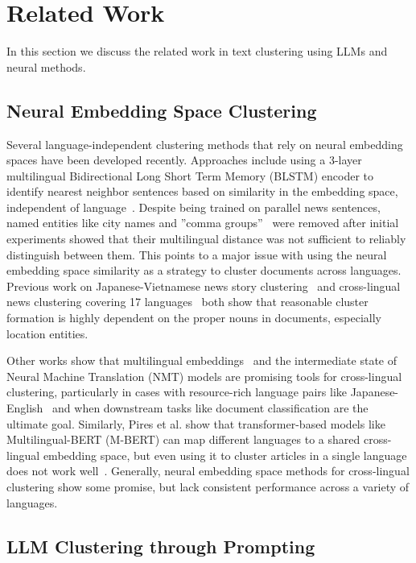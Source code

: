 \section{Related Work}\label{section:related_work}

In this section we discuss the related work in text clustering using LLMs and neural methods.

\subsection{Neural Embedding Space Clustering} 

Several language-independent clustering methods that rely on neural embedding spaces have been developed recently.
Approaches include using a 3-layer multilingual Bidirectional Long Short Term Memory (BLSTM) encoder to identify nearest neighbor sentences based on similarity in the embedding space, independent of language~\cite{Schw18}. 
Despite being trained on parallel news sentences, named entities like city names and ''comma groups''~\cite{Lieb10b} were removed after initial experiments showed that their multilingual distance was not sufficient to reliably distinguish between them. 
This points to a major issue with using the neural embedding space similarity as a strategy to cluster documents across languages. 
Previous work on Japanese-Vietnamese news story clustering~\cite{Hong17} and cross-lingual news clustering covering 17 languages~\cite{Schneider2023} both show that reasonable cluster formation is highly dependent on the proper nouns in documents, especially location entities. 

Other works show that multilingual embeddings~\cite{Amma18} and the intermediate state of Neural Machine Translation (NMT) models are promising tools for cross-lingual clustering, particularly in cases with resource-rich language pairs like Japanese-English~\cite{Seki18} and when downstream tasks like document classification are the ultimate goal. 
Similarly, Pires et al. show that transformer-based models like Multilingual-BERT (M-BERT) can map different languages to a shared cross-lingual embedding space, but even using it to cluster articles in a single language does not work well~\cite{Pire19, Stan20}. 
Generally, neural embedding space methods for cross-lingual clustering show some promise, but lack consistent performance across a variety of languages.


\subsection{LLM Clustering through Prompting}

